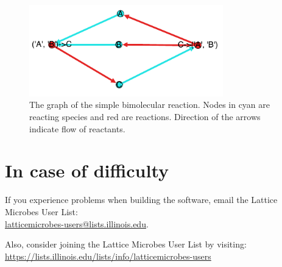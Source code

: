 \begin{figure}[h!]
  \centering
      \includegraphics[width=0.75\textwidth]{Figures/RxnGraph.pdf}
  \caption{The graph of the simple bimolecular reaction.  Nodes in cyan are reacting species and red are reactions.  Direction of the arrows indicate flow of reactants.} \label{fig:graph}
\end{figure}


\section{In case of difficulty}
If you experience problems when building the software, email the Lattice Microbes User List:\\ \url{latticemicrobes-users@lists.illinois.edu}.

Also, consider joining the Lattice Microbes User List by visiting: \\ \url{https://lists.illinois.edu/lists/info/latticemicrobes-users}


